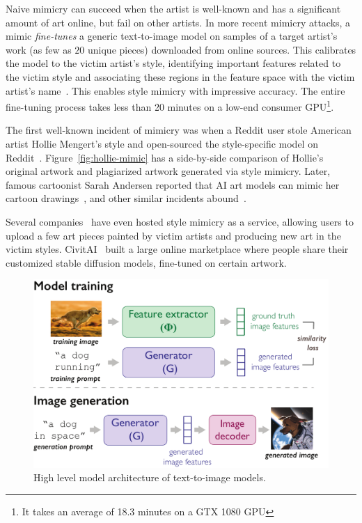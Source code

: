 Naive mimicry can succeed when the artist is well-known and
has a significant amount of art online, but fail on other artists. In more recent
mimicry attacks, a mimic {\em fine-tunes} a
generic text-to-image model on samples of a target artist's work
(as few as $20$ unique pieces) downloaded from online sources. This calibrates the model to
the victim artist's style, identifying important features related to the
victim style and associating these regions in the feature space with the
victim artist's name~\cite{ruiz2022dreambooth,gal2022image}. This enables
style mimicry with impressive accuracy.  The entire fine-tuning process takes
less than 20 minutes on a low-end consumer GPU\footnote{It takes an average
  of 18.3 minutes on a GTX 1080 GPU}.

The first well-known incident of mimicry was when a Reddit user stole
American artist Hollie Mengert's style and open-sourced the style-specific
model on Reddit~\cite{hollie-steal}. Figure~\ref{fig:hollie-mimic} has a
side-by-side comparison of Hollie's original artwork and plagiarized artwork
generated via style mimicry. Later, famous cartoonist Sarah Andersen reported
that AI art models can mimic her cartoon drawings~\cite{sarah-andersen}, and
other similar incidents abound~\cite{lensa-steal,sam-steal}.

Several companies~\cite{aigame} have even hosted style mimicry
as a service, allowing users to upload a few art pieces painted by victim
artists and producing new art in the victim styles. CivitAI~\cite{civitai}
built a large online marketplace where people share their customized stable
diffusion models, fine-tuned on certain artwork.  

\begin{figure}[t]
  \centering
  \includegraphics[width=1\columnwidth]{plots/overview/diffusion-arch.pdf}
  \vspace{-0.25in}
  \caption{High level model architecture of text-to-image models. }
  \label{fig:diffusion-arch}
\end{figure}

